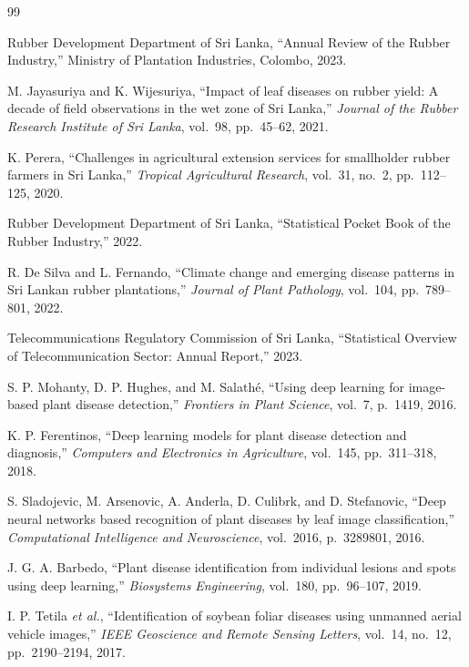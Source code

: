 \begin{thebibliography}{99}

Rubber Development Department of Sri Lanka, ``Annual Review of the Rubber Industry,'' Ministry of Plantation Industries, Colombo, 2023.

M. Jayasuriya and K. Wijesuriya, ``Impact of leaf diseases on rubber yield: A decade of field observations in the wet zone of Sri Lanka,'' \textit{Journal of the Rubber Research Institute of Sri Lanka}, vol.~98, pp.~45--62, 2021.

K. Perera, ``Challenges in agricultural extension services for smallholder rubber farmers in Sri Lanka,'' \textit{Tropical Agricultural Research}, vol.~31, no.~2, pp.~112--125, 2020.

Rubber Development Department of Sri Lanka, ``Statistical Pocket Book of the Rubber Industry,'' 2022.

R. De Silva and L. Fernando, ``Climate change and emerging disease patterns in Sri Lankan rubber plantations,'' \textit{Journal of Plant Pathology}, vol.~104, pp.~789--801, 2022.

Telecommunications Regulatory Commission of Sri Lanka, ``Statistical Overview of Telecommunication Sector: Annual Report,'' 2023.

S. P. Mohanty, D. P. Hughes, and M. Salath\'{e}, ``Using deep learning for image-based plant disease detection,'' \textit{Frontiers in Plant Science}, vol.~7, p.~1419, 2016.

K. P. Ferentinos, ``Deep learning models for plant disease detection and diagnosis,'' \textit{Computers and Electronics in Agriculture}, vol.~145, pp.~311--318, 2018.

S. Sladojevic, M. Arsenovic, A. Anderla, D. Culibrk, and D. Stefanovic, ``Deep neural networks based recognition of plant diseases by leaf image classification,'' \textit{Computational Intelligence and Neuroscience}, vol.~2016, p.~3289801, 2016.

J. G. A. Barbedo, ``Plant disease identification from individual lesions and spots using deep learning,'' \textit{Biosystems Engineering}, vol.~180, pp.~96--107, 2019.

I. P. Tetila \textit{et al.}, ``Identification of soybean foliar diseases using unmanned aerial vehicle images,'' \textit{IEEE Geoscience and Remote Sensing Letters}, vol.~14, no.~12, pp.~2190--2194, 2017.


\end{thebibliography}
